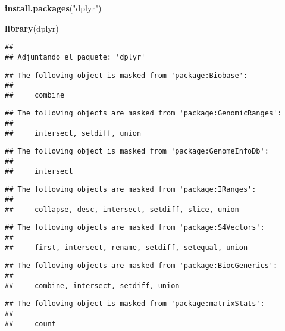 \documentclass[
]{article}
\newenvironment{Shaded}{\begin{snugshade}}{\end{snugshade}}
\newcommand{\FunctionTok}[1]{\textcolor[rgb]{0.13,0.29,0.53}{\textbf{#1}}}
\newcommand{\NormalTok}[1]{#1}
\newcommand{\StringTok}[1]{\textcolor[rgb]{0.31,0.60,0.02}{#1}}
\begin{document}
\begin{Shaded}
\begin{Highlighting}[]
\FunctionTok{install.packages}\NormalTok{(}\StringTok{"dplyr"}\NormalTok{)}
\end{Highlighting}
\end{Shaded}

\begin{Shaded}
\begin{Highlighting}[]
\FunctionTok{library}\NormalTok{(dplyr)}
\end{Highlighting}
\end{Shaded}

\begin{verbatim}
## 
## Adjuntando el paquete: 'dplyr'
\end{verbatim}

\begin{verbatim}
## The following object is masked from 'package:Biobase':
## 
##     combine
\end{verbatim}

\begin{verbatim}
## The following objects are masked from 'package:GenomicRanges':
## 
##     intersect, setdiff, union
\end{verbatim}

\begin{verbatim}
## The following object is masked from 'package:GenomeInfoDb':
## 
##     intersect
\end{verbatim}

\begin{verbatim}
## The following objects are masked from 'package:IRanges':
## 
##     collapse, desc, intersect, setdiff, slice, union
\end{verbatim}

\begin{verbatim}
## The following objects are masked from 'package:S4Vectors':
## 
##     first, intersect, rename, setdiff, setequal, union
\end{verbatim}

\begin{verbatim}
## The following objects are masked from 'package:BiocGenerics':
## 
##     combine, intersect, setdiff, union
\end{verbatim}

\begin{verbatim}
## The following object is masked from 'package:matrixStats':
## 
##     count
\end{verbatim}
\end{document}
